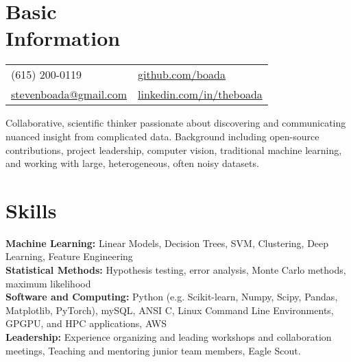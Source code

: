 \documentclass[margin,line, 11pt]{res}
\begin{document}

\begin{resume}
\vspace*{-2mm}
\section{Basic\\Information}
\begin{tabular}{@{}p{4.9in}p{4in}}
  (615) 200-0119 & \href{https://github.com/boada}{github.com/boada} \\
  \href{mailto:stevenboada@gmail.com}{stevenboada@gmail.com} & \href{https://linkedin.com/in/theboada}{linkedin.com/in/theboada} \\
\end{tabular}

\vspace{-3mm}
Collaborative, scientific thinker passionate about discovering and communicating nuanced insight from complicated data. Background including open-source contributions, project leadership, computer vision, traditional machine learning, and working with large, heterogeneous, often noisy datasets.
\vspace*{-2mm}

\section{Skills}
\textbf{Machine Learning:} Linear Models, Decision Trees, SVM, Clustering, Deep Learning, Feature Engineering\\
\textbf{Statistical Methods:} Hypothesis testing, error analysis, Monte Carlo methods, maximum likelihood\\
\textbf{Software and Computing:}  Python (e.g. Scikit-learn, Numpy, Scipy, Pandas, Matplotlib, PyTorch), mySQL, ANSI C, Linux Command Line Environments, GPGPU, and HPC applications, AWS \\
\textbf{Leadership:} Experience organizing and leading workshops and collaboration meetings, Teaching and mentoring junior team members, Eagle Scout. \\
\vspace*{-7mm}


\end{resume}
\end{document}
